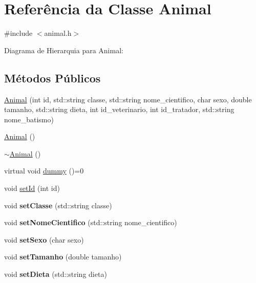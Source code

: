 \hypertarget{classAnimal}{}\section{Referência da Classe Animal}
\label{classAnimal}


{\ttfamily \#include $<$animal.\+h$>$}



Diagrama de Hierarquia para Animal\+:
\subsection*{Métodos Públicos}
\begin{DoxyCompactItemize}
\item 
\hyperlink{classAnimal_a4ce85e4ceabe2a6342a3dcbbd18f5bc1}{Animal} (int id, std\+::string classe, std\+::string nome\+\_\+cientifico, char sexo, double tamanho, std\+::string dieta, int id\+\_\+veterinario, int id\+\_\+tratador, std\+::string nome\+\_\+batismo)
\item 
\hyperlink{classAnimal_a1e726a49ec952443190ac62dad22353c}{Animal} ()
\item 
\hyperlink{classAnimal_a476af25adde5f0dfa688129c8f86fa5c}{$\sim$\+Animal} ()
\item 
virtual void \hyperlink{classAnimal_a88fa81bb01530eaa71656b678bf05b5b}{dummy} ()=0
\item 
void \hyperlink{classAnimal_af5a262e8a6e04632a48307101494925c}{set\+Id} (int id)
\item 
\mbox{\label{classAnimal_ae1956de8a017d0b1cd506935cd1a57e0}} 
void {\bfseries set\+Classe} (std\+::string classe)
\item 
\mbox{\label{classAnimal_ad2e0ffb0dcb6b58467010d9f11488899}} 
void {\bfseries set\+Nome\+Cientifico} (std\+::string nome\+\_\+cientifico)
\item 
\mbox{\label{classAnimal_aab32d5ad6689a4e19cfd43a303c939af}} 
void {\bfseries set\+Sexo} (char sexo)
\item 
\mbox{\label{classAnimal_a53daf7711c6b6430c723647b2cec7c36}} 
void {\bfseries set\+Tamanho} (double tamanho)
\item 
\mbox{\label{classAnimal_a1b6ae4e4360c2a3b15c1759a654ef84b}} 
void {\bfseries set\+Dieta} (std\+::string dieta)

\end{DoxyCompactItemize}
